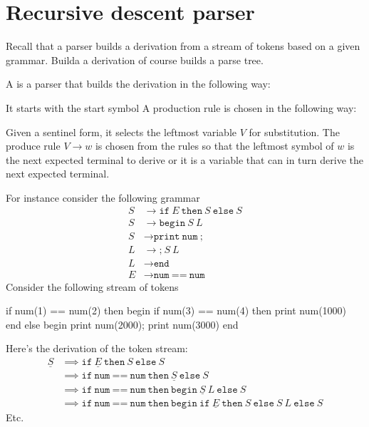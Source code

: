 \section{Recursive descent parser}

Recall that a parser builds a derivation from a stream of tokens
based on a given grammar.
Builda a derivation of course builds a parse tree.

A  is a parser that
builds the derivation in the following way:
\begin{itemize}
  \li It starts with the start symbol
  \li A production rule is chosen in the following way:
  \begin{itemize}
    \li Given a sentinel form, it selects the leftmost variable $V$
    for substitution.
    \li The produce rule $V \rightarrow w$ is chosen from the rules
    so that the leftmost symbol of $w$ is the next expected terminal to derive or
    it is a variable that can in turn derive the next expected terminal.
  \end{itemize}
\end{itemize}

For instance consider the following grammar
\begin{align*}
  S &\rightarrow \texttt{if} \ E \ \texttt{then} \ S \ \texttt{else} \ S \\
  S &\rightarrow \texttt{begin} \ S \ L \\
  S &\rightarrow \texttt{print} \ \texttt{num} \ \texttt{;}\\
  L &\rightarrow \texttt{;} \ S \ L \\
  L &\rightarrow \texttt{end} \\
  E &\rightarrow \texttt{num} \ \texttt{==} \ \texttt{num} 
\end{align*}
Consider the following stream of tokens
\begin{console}
if num(1) == num(2) then
begin
    if num(3) == num(4) then
        print num(1000)
end
else
begin
    print num(2000);
    print num(3000)
end
\end{console}
Here's the derivation of the token stream:
\begin{align*}
  \underline{S}
  &\implies \texttt{if} \ \underline{E} \ \texttt{then} \ S \ \texttt{else} \ S \\
  &\implies \texttt{if} \ \texttt{num} \ \texttt{==} \ \texttt{num} \ \texttt{then} \ \underline{S} \ \texttt{else} \ S \\
  &\implies \texttt{if} \ \texttt{num} \ \texttt{==} \ \texttt{num} \ \texttt{then} \ \texttt{begin} \ \underline{S} \ L \ \texttt{else} \ S \\
  &\implies \texttt{if} \ \texttt{num} \ \texttt{==} \ \texttt{num} \ \texttt{then} \ \texttt{begin} \ \texttt{if} \ \underline{E} \ \texttt{then} \ S \ \texttt{else} \ S\ L \ \texttt{else} \ S
\end{align*}
Etc.


